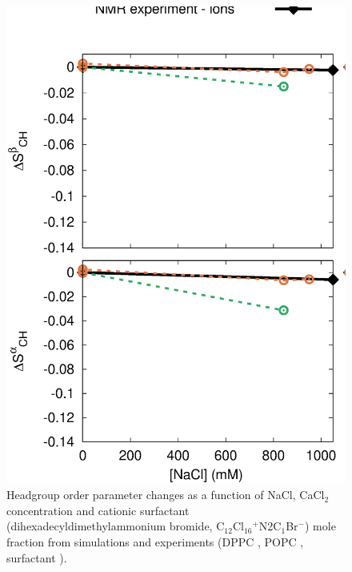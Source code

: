 \documentclass[aip,jcp,twocolumn]{revtex4}
\begin{document}
\begin{figure}[]
  \centering
  \includegraphics[width=16.0cm]{../Fig/OrdParChanges_NaCl_CaCl2_surf.eps}
  \caption{\label{OrderParameterCHANGESnewMODELS}
    Headgroup order parameter changes as a function of NaCl, CaCl$_2$ concentration and
    cationic surfactant (dihexadecyldimethylammonium bromide, C$_{12}$Cl$_{16}$$^+$N2C$_1$Br$^-$) mole fraction
    from simulations and experiments (DPPC \cite{akutsu81}, POPC \cite{altenbach84}, surfactant \cite{scherer89}).
  }
\end{figure}
\end{document}
